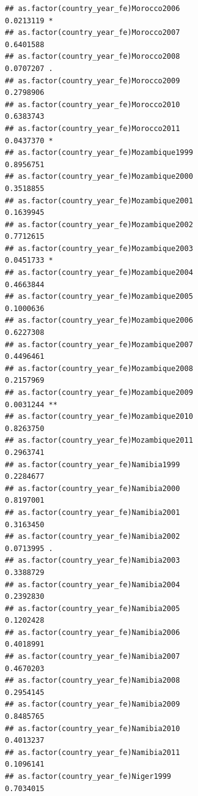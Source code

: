 \documentclass[
  a4paper,
]{article}
\begin{document}
\begin{verbatim}
## as.factor(country_year_fe)Morocco2006                          0.0213119 *  
## as.factor(country_year_fe)Morocco2007                          0.6401588    
## as.factor(country_year_fe)Morocco2008                          0.0707207 .  
## as.factor(country_year_fe)Morocco2009                          0.2798906    
## as.factor(country_year_fe)Morocco2010                          0.6383743    
## as.factor(country_year_fe)Morocco2011                          0.0437370 *  
## as.factor(country_year_fe)Mozambique1999                       0.8956751    
## as.factor(country_year_fe)Mozambique2000                       0.3518855    
## as.factor(country_year_fe)Mozambique2001                       0.1639945    
## as.factor(country_year_fe)Mozambique2002                       0.7712615    
## as.factor(country_year_fe)Mozambique2003                       0.0451733 *  
## as.factor(country_year_fe)Mozambique2004                       0.4663844    
## as.factor(country_year_fe)Mozambique2005                       0.1000636    
## as.factor(country_year_fe)Mozambique2006                       0.6227308    
## as.factor(country_year_fe)Mozambique2007                       0.4496461    
## as.factor(country_year_fe)Mozambique2008                       0.2157969    
## as.factor(country_year_fe)Mozambique2009                       0.0031244 ** 
## as.factor(country_year_fe)Mozambique2010                       0.8263750    
## as.factor(country_year_fe)Mozambique2011                       0.2963741    
## as.factor(country_year_fe)Namibia1999                          0.2284677    
## as.factor(country_year_fe)Namibia2000                          0.8197001    
## as.factor(country_year_fe)Namibia2001                          0.3163450    
## as.factor(country_year_fe)Namibia2002                          0.0713995 .  
## as.factor(country_year_fe)Namibia2003                          0.3388729    
## as.factor(country_year_fe)Namibia2004                          0.2392830    
## as.factor(country_year_fe)Namibia2005                          0.1202428    
## as.factor(country_year_fe)Namibia2006                          0.4018991    
## as.factor(country_year_fe)Namibia2007                          0.4670203    
## as.factor(country_year_fe)Namibia2008                          0.2954145    
## as.factor(country_year_fe)Namibia2009                          0.8485765    
## as.factor(country_year_fe)Namibia2010                          0.4013237    
## as.factor(country_year_fe)Namibia2011                          0.1096141    
## as.factor(country_year_fe)Niger1999                            0.7034015    

\end{verbatim}
\end{document}
